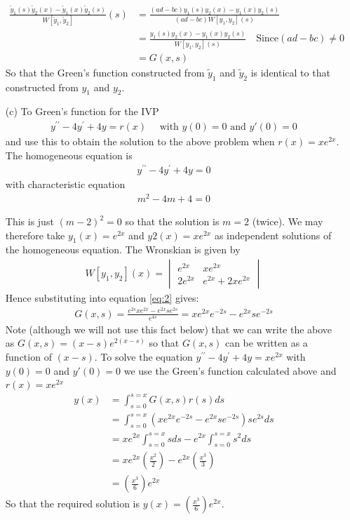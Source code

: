 \documentclass[12pt,a4paper]{article}
\begin{document}
\begin{enumerate}
	\begin{align*}
	    \frac{\tilde{y}_1(s)\tilde{y}_2(x) - \tilde{y}_1(x)\tilde{y}_2(s)}{W[\tilde{y}_1,\tilde{y}_2]}(s)  &= \frac{(ad - bc){y_1(s)y_2(x) - y_1(x)y_2(s)}}{(ad - bc)W[y_1,y_2](s)}\\
	    &= \frac{y_1(s)y_2(x) - y_1(x)y_2(s)}{W[y_1,y_2](s)} \quad \text{Since} (ad - bc) \neq 0\\
	    &= G(x,s)
	\end{align*}
So that the Green’s function constructed from $\tilde{y}_1$ and $\tilde{y}_2$ is identical to that constructed
from $y_1$ and $y_2$.
\item[(c)] To Green’s function for the IVP
    \begin{align*}
        y^{\prime \prime} - 4y^\prime + 4y = r(x) \quad \text{ with } y(0)=0 \text{ and } y\prime(0)=0
    \end{align*}
    and use this to obtain the solution to the above problem when $r(x) = xe^{2x}$.
The homogeneous equation is
    \begin{align*}
        y^{\prime \prime} - 4y^\prime + 4y = 0
    \end{align*}
with characteristic equation
    \begin{align*}
        m^2 - 4m + 4 = 0
    \end{align*}

This is just $(m - 2)^2 = 0$ so that the solution is $m = 2$ (twice). We may therefore take $y_1(x) = e^{2x}$ and $y2(x) = xe^{2x}$ as independent solutions of the homogeneous equation. The Wronskian is given by
\begin{align*}
    W[y_1,y_2](x) = \begin{vmatrix}
                    e^{2x} & xe^{2x} \\ 
                    2e^{2x} & e^{2x} + 2xe^{2x}
                    \end{vmatrix}
\end{align*}
Hence substituting into equation \eqref{eq:2} gives:
\begin{align*}
    G(x, s) = \frac{e^{2s}xe^{2x} -  e^{2x}se^{2s}}{e^{4s}} = xe^{2x}e^{-2s} - e^{2x}se^{-2s}
\end{align*}
Note (although we will not use this fact below) that we can write the above as $G(x, s) = (x - s)e^{2(x-s)}$ so that $G(x, s)$ can be written as a function of $(x - s)$.
To solve the equation $y^{\prime \prime} - 4y^\prime + 4y = xe^{2x}$ with $y(0)=0$ and $y\prime (0)=0 $ we use the Green’s function calculated above and $r(x) = xe^{2x}$
\begin{align*}
    y(x) &= \int_{s=0}^{s=x} G(x,s)r(s) ds\\
        &= \int_{s=0}^{s=x} (xe^{2x}e^{-2s} - e^{2x}se^{-2s})se^{2s} ds\\
        &= xe^{2x} \int_{s=0}^{s=x} sds  - e^{2x} \int_{s=0}^{s=x} s^2 ds\\
        &= xe^{2x}(\frac{x^2}{2}) - e^{2x}(\frac{x^3}{3})\\
        &= (\frac{x^3}{6})e^{2x}
\end{align*}
So that the required solution is $y(x) =  (\frac{x^3}{6})e^{2x}$.

\end{enumerate}
\end{document}
